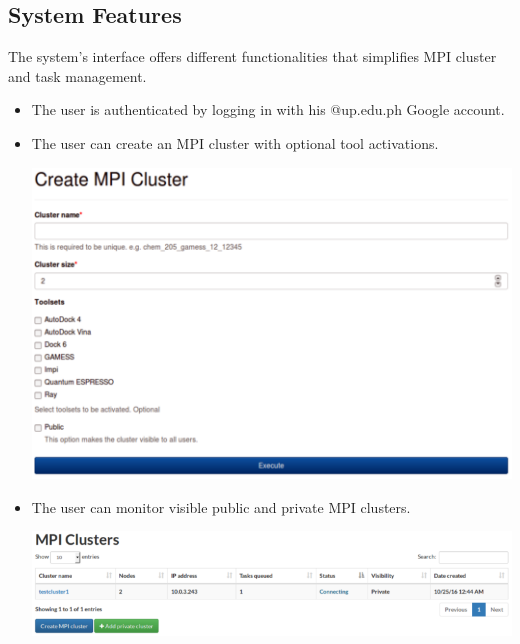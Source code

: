 \subsection{System Features}
The system's interface offers different functionalities that simplifies MPI cluster and task management.
		
	\begin{itemize}
		\item The user is authenticated by logging in with his @up.edu.ph Google account.
		\item The user can create an MPI cluster with optional tool activations. 
			\begin{center}			
				\includegraphics[scale=0.50]{./images/create_mpi.png}
			\end{center}	
	
		\item The user can monitor visible public and private MPI clusters.  \newline	
		\begin{center}			
			\includegraphics[scale=0.33]{./images/mpi_list_view.png}
		\end{center}
		

\end{itemize}
